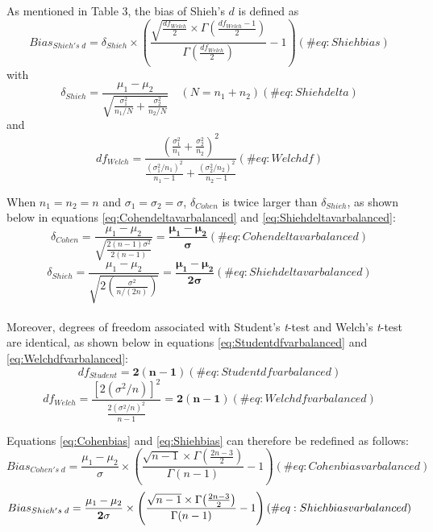 \documentclass[
]{article}
\begin{document}
As mentioned in Table 3, the bias of Shieh's \(d\) is defined as
\begin{equation} 
Bias_{Shieh's \; d}=\delta_{Shieh} \times \left( \frac{\sqrt{\frac{df_{Welch}}{2}} \times \Gamma{\left(\frac{df_{Welch}-1}{2}\right)}}{\Gamma{\left( \frac{df_{Welch}}{2}\right)}} -1 \right)
(\#eq:Shiehbias)
\end{equation} with \begin{equation*} 
\delta_{Shieh}=\frac{\mu_1-\mu_2}{\sqrt{\frac{\sigma^2_1}{n_1/N}+\frac{\sigma^2_2}{n_2/N}}} \quad (N=n_1+n_2)
(\#eq:Shiehdelta)
\end{equation*} and \begin{equation*} 
df_{Welch}=\frac{\left(\frac{\sigma^2_1}{n_1}+\frac{\sigma^2_2}{n_2} \right)^2}{\frac{(\sigma^2_1/n_1)^2}{n_1-1}+\frac{(\sigma^2_2/n_2)^2}{n_2-1}}
(\#eq:Welchdf)
\end{equation*}

When \(n_1=n_2=n\) and \(\sigma_1=\sigma_2=\sigma\), \(\delta_{Cohen}\)
is twice larger than \(\delta_{Shieh}\), as shown below in equations
\ref{eq:Cohendeltavarbalanced} and \ref{eq:Shiehdeltavarbalanced}:
\begin{equation} 
\delta_{Cohen}=\frac{\mu_1-\mu_2}{\sqrt{\frac{2(n-1)\sigma^2}{2(n-1)}}}=\bm{\frac{\mu_1-\mu_2}{\sigma}}
(\#eq:Cohendeltavarbalanced)
\end{equation} \begin{equation} 
\delta_{Shieh}=\frac{\mu_1-\mu_2}{\sqrt{2\left( \frac{\sigma^2}{n/(2n)}\right)}}=\bm{\frac{\mu_1-\mu_2}{2\sigma}} 
(\#eq:Shiehdeltavarbalanced)
\end{equation}\\
Moreover, degrees of freedom associated with Student's \emph{t}-test and
Welch's \emph{t}-test are identical, as shown below in equations
\ref{eq:Studentdfvarbalanced} and \ref{eq:Welchdfvarbalanced}:
\begin{equation} 
df_{Student}=\bm{2(n-1)} 
(\#eq:Studentdfvarbalanced)
\end{equation} \begin{equation} 
df_{Welch}=\frac{\left[2(\sigma^2/n)\right]^2}{\frac{2(\sigma^2/n)^2}{n-1}}= \bm{2(n-1)} 
(\#eq:Welchdfvarbalanced)
\end{equation}

Equations \ref{eq:Cohenbias} and \ref{eq:Shiehbias} can therefore be
redefined as follows: \begin{equation} 
Bias_{Cohen's \; d}=\frac{\mu_1-\mu_2}{\sigma} \times \left( \frac{\sqrt{n-1} \times \Gamma{\left(\frac{2n-3}{2}\right)}}{\Gamma{\left( n-1\right)}} -1 \right)
(\#eq:Cohenbiasvarbalanced)
\end{equation} \begin{equation} 
Bias_{Shieh's \; d}=\frac{\mu_1-\mu_2}{\bf 2\sigma} \times \left( \frac{\sqrt{n-1} \times \Gamma{\left(\frac{2n-3}{2}\right)}}{\Gamma{\left( n-1\right)}} -1 \right)
(\#eq:Shiehbiasvarbalanced)
\end{equation}
\end{document}
